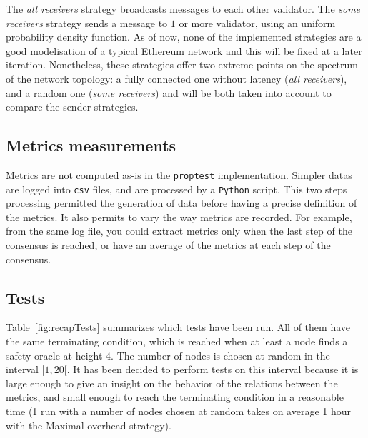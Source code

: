 The \textit{all receivers} strategy broadcasts messages to each other validator.
The \textit{some receivers} strategy sends a message to \(1\) or more validator,
using an uniform probability density function.  As of now, none of the
implemented strategies are a good modelisation of a typical Ethereum network and
this will be fixed at a later iteration.  Nonetheless, these strategies offer
two extreme points on the spectrum of the network topology: a fully connected
one without latency (\textit{all receivers}), and a random one (\textit{some
receivers}) and will be both taken into account to compare the sender
strategies.

\subsection{Metrics measurements}
Metrics are not computed as-is in the \texttt{proptest} implementation. Simpler
datas are logged into \texttt{csv} files, and are processed by a \texttt{Python}
script.  This two steps processing permitted the generation of
data before having a precise definition of the metrics. It also permits to vary
the way metrics are recorded. For example, from the same log file, you could
extract metrics only when the last step of the consensus is reached, or have an
average of the metrics at each step of the consensus.

\subsection{Tests}
Table~\ref{fig:recapTests} summarizes which tests have been run.
All of them have the same terminating condition, which is reached when at least a
node finds a safety oracle at height 4. The number of nodes is chosen at random
in the interval \([1, 20[\). It has been decided to perform tests on this
interval because it is large enough to give an insight on the behavior of the
relations between the metrics, and small enough to reach the terminating condition in
a reasonable time (1 run with a number of nodes chosen at random takes on average 1 hour
with the Maximal overhead strategy).


